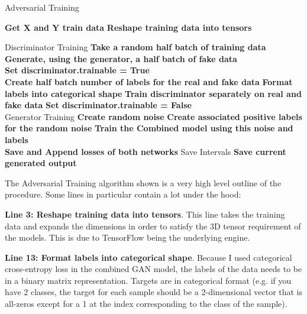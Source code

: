 \documentclass[12pt,a4paper,twoside]{report}
\begin{document}
\begin{algorithm}[H]
\caption{Adversarial Training }\label{gan-train}
\begin{algorithmic}[1]
	
        \State \textbf{Get X and Y train data}
        \State \textbf{Reshape training data into tensors} 
        \State 
         
		\State
		\Comment Discriminator Training 
		\State \textbf{Take a random half batch of training data}
		\State \textbf{Generate, using the generator, a half batch of fake data}\\
		\State \textbf{Set discriminator.trainable = True}\\
		\State \textbf{Create half batch number of labels for the real and fake data}
		\State \textbf{Format labels into categorical shape}
		\State \textbf{Train discriminator separately on real and fake data}
		\State \textbf{Set discriminator.trainable = False}\\
		\State
		\Comment Generator Training 
		\State \textbf{Create random noise} 
		\State \textbf{Create associated positive labels for the random noise}
		\State \textbf{Train the Combined model using this noise and labels}\\
		\State \textbf{Save and Append losses of both networks }
		\State
		\Comment Save Intervals
			\State \textbf{Save current generated output}
		\EndIf
   	\EndFor
   
\EndProcedure
\end{algorithmic}
\end{algorithm}

The Adversarial Training algorithm shown is a very high level outline of the procedure. Some lines in particular contain a lot under the hood:

\textbf{Line 3: Reshape training data into tensors}. This line takes the training data and expands the dimensions in order to satisfy the 3D tensor requirement of the models. This is due to TensorFlow being the underlying engine. 

\textbf{Line 13: Format labels into categorical shape}. Because I used categorical cross-entropy loss in the combined GAN model, the labels of the data needs to be in a binary matrix representation. Targets are in categorical format (e.g. if you have 2 classes, the target for each sample should be a 2-dimensional vector that is all-zeros except for a 1 at the index corresponding to the class of the sample).
\end{document}
